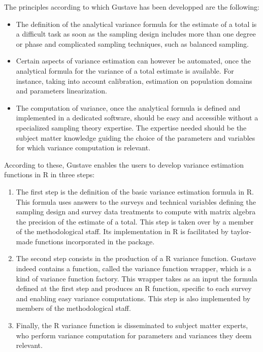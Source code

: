 \documentclass[12pt,a4paper]{article}
\begin{document}
\par The principles according to which Gustave has been developped are the following:
\begin{itemize}
\item The definition of the analytical variance formula for the estimate of a total is a difficult task as soon as the sampling design includes more than one degree or phase and complicated sampling techniques, such as balanced sampling.\\
\item Certain aspects of variance estimation can however be automated, once the analytical formula for the variance of a total estimate is available. For instance, taking into account  calibration, estimation on population domains and parameters linearization.\\
\item The computation of variance, once the analytical formula is defined and implemented in a dedicated software, should be easy and accessible without a specialized sampling theory expertise. The expertise needed should be the subject matter knowledge guiding the choice of the parameters and variables for which variance computation is relevant.\\
\end{itemize}

\par According to these, Gustave enables the users to develop variance estimation functions in R in three steps:\\
\begin{enumerate}
\item The first step is the definition of the basic variance estimation formula in R. This formula uses answers to the surveys and technical variables defining the sampling design and survey data treatments to compute with matrix algebra the precision of the estimate of a total. This step is taken over by a member of the methodological staff. Its implementation in R is facilitated by taylor-made functions incorporated in the package.\\
\item The second step consists in the production of a R variance function. Gustave indeed contains a function, called the variance function wrapper, which is a kind of variance function factory. This wrapper takes as an input the formula defined at the first step and produces an R function, specific to each survey and enabling easy variance computations. This step is also implemented by members of the methodological staff.\\
\item Finally, the R variance function is disseminated to subject matter experts, who perform variance computation for parameters and variances they deem relevant.\\
\end{enumerate}
\end{document}
